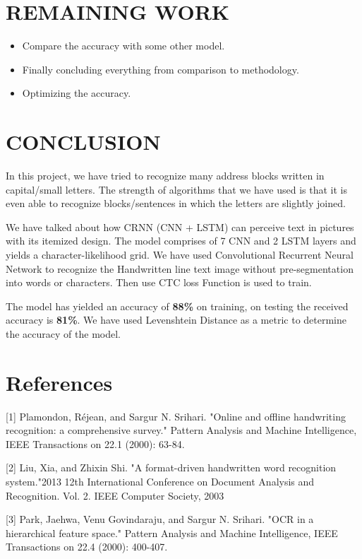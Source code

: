 \documentclass[12pt, conference]{IEEEtran}
\begin{document}
\section{\textbf{REMAINING WORK}}
\begin{itemize}
    \item Compare the accuracy with some other model.
    \item Finally concluding everything from comparison to methodology.
    \item Optimizing the accuracy.
\end{itemize}

\section{\textbf{CONCLUSION}}
In this project, we have tried to recognize many address blocks written in capital/small letters. The strength of algorithms that we have used is that it is even able to recognize blocks/sentences in which the letters are slightly joined.

We have talked about how CRNN (CNN + LSTM) can perceive text in pictures with its itemized design. The model comprises of 7 CNN and 2 LSTM layers and yields a character-likelihood grid. We have used Convolutional Recurrent Neural Network to recognize the Handwritten line text image without pre-segmentation into words or characters. Then use CTC loss Function is used to train.

The model has yielded an accuracy of \textbf{88\%} on training, on testing the received accuracy is \textbf{81\%}. We have used Levenshtein Distance as a metric to determine the accuracy of the model.

\section{\textbf{References}}
[1] Plamondon, Réjean, and Sargur N. Srihari. "Online and offline handwriting recognition: a comprehensive survey." Pattern Analysis and Machine Intelligence, IEEE Transactions on 22.1 (2000): 63-84.

[2] Liu, Xia, and Zhixin Shi. "A format-driven handwritten word recognition system."2013 12th International Conference on Document Analysis and Recognition. Vol. 2. IEEE Computer Society, 2003

[3] Park, Jaehwa, Venu Govindaraju, and Sargur N. Srihari. "OCR in a hierarchical feature space." Pattern Analysis and Machine Intelligence, IEEE Transactions on 22.4 (2000): 400-407.
\end{document}

